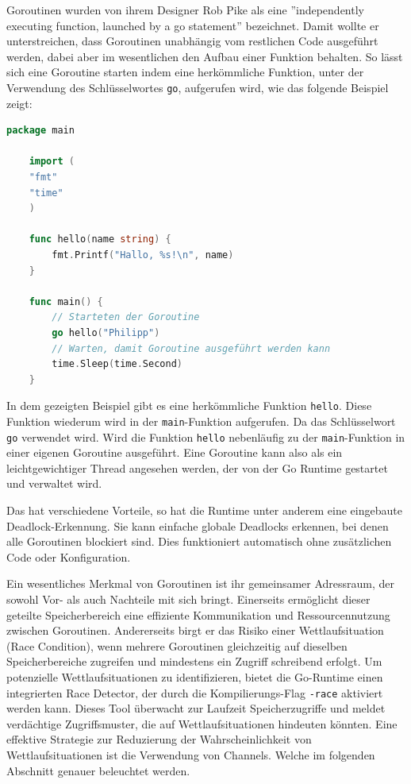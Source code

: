 \documentclass[fontsize=12pt,paper=a4,twoside=semi,parskip=half-,headsepline,headinclude]{scrreprt}
\begin{document}
Goroutinen wurden von ihrem Designer Rob Pike als eine ''independently executing function, launched by a go statement''\cite{Pike2012} bezeichnet. Damit wollte er unterstreichen, dass Goroutinen unabhängig vom restlichen Code ausgeführt werden, dabei aber im wesentlichen den Aufbau einer Funktion behalten. So lässt sich eine Goroutine starten indem eine herkömmliche Funktion, unter der Verwendung des Schlüsselwortes \texttt{go}, aufgerufen wird, wie das folgende Beispiel zeigt:

\begin{lstlisting}[language=Go,extendedchars=true]
	package main
	
	import (
	"fmt"
	"time"
	)
	
	func hello(name string) {
		fmt.Printf("Hallo, %s!\n", name)
	}
	
	func main() {
		// Starteten der Goroutine
		go hello("Philipp")
		// Warten, damit Goroutine ausgeführt werden kann
		time.Sleep(time.Second)
	}
\end{lstlisting}

In dem gezeigten Beispiel gibt es eine herkömmliche Funktion \texttt{hello}. Diese Funktion wiederum wird in der \texttt{main}-Funktion aufgerufen. Da das Schlüsselwort \texttt{go} verwendet wird. Wird die Funktion \texttt{hello} nebenläufig zu der \texttt{main}-Funktion in einer eigenen Goroutine ausgeführt. Eine Goroutine kann also als ein leichtgewichtiger Thread angesehen werden, der von der Go Runtime gestartet und verwaltet wird. 

Das hat verschiedene Vorteile, so hat die Runtime unter anderem eine eingebaute Deadlock-Erkennung. Sie kann einfache globale Deadlocks erkennen, bei denen alle Goroutinen blockiert sind. Dies funktioniert automatisch ohne zusätzlichen Code oder Konfiguration.

Ein wesentliches Merkmal von Goroutinen ist ihr gemeinsamer Adressraum, der sowohl Vor- als auch Nachteile mit sich bringt. Einerseits ermöglicht dieser geteilte Speicherbereich eine effiziente Kommunikation und Ressourcennutzung zwischen Goroutinen. Andererseits birgt er das Risiko einer Wettlaufsituation (Race Condition), wenn mehrere Goroutinen gleichzeitig auf dieselben Speicherbereiche zugreifen und mindestens ein Zugriff schreibend erfolgt. Um potenzielle Wettlaufsituationen zu identifizieren, bietet die Go-Runtime einen integrierten Race Detector\cite{DataRace2024}, der durch die Kompilierungs-Flag \texttt{-race} aktiviert werden kann. Dieses Tool überwacht zur Laufzeit Speicherzugriffe und meldet verdächtige Zugriffsmuster, die auf Wettlaufsituationen hindeuten könnten. Eine effektive Strategie zur Reduzierung der Wahrscheinlichkeit von Wettlaufsituationen ist die Verwendung von Channels. Welche im folgenden Abschnitt genauer beleuchtet werden.
\end{document}
